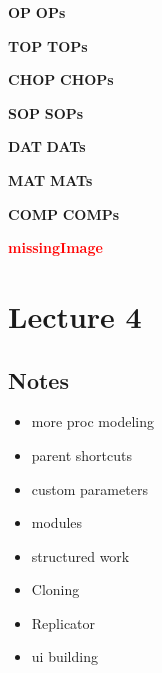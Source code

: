 \def\boldcommandlist{\@elt OP,\@elt OPs,}
\def\@elt#1,{%
 \expandafter\def\csname#1\endcsname{\textbf{#1}\xspace}
}
\boldcommandlist

\def\topColorList{\@elt TOP,\@elt TOPs,}
\def\@elt#1,{%
 \expandafter\def\csname#1\endcsname{\textcolor{TOP}{\textbf{#1}}\xspace}
}
\topColorList

\def\chopColorList{\@elt CHOP,\@elt CHOPs,}
\def\@elt#1,{%
 \expandafter\def\csname#1\endcsname{\textcolor{CHOP}{\textbf{#1}}\xspace}
}
\chopColorList

\def\sopColorList{\@elt SOP,\@elt SOPs,}
\def\@elt#1,{%
 \expandafter\def\csname#1\endcsname{\textcolor{SOP}{\textbf{#1}}\xspace}
}
\sopColorList

\def\datColorList{\@elt DAT,\@elt DATs,}
\def\@elt#1,{%
 \expandafter\def\csname#1\endcsname{\textcolor{DAT}{\textbf{#1}}\xspace}
}
\datColorList

\def\matColorList{\@elt MAT,\@elt MATs,}
\def\@elt#1,{%
 \expandafter\def\csname#1\endcsname{\textcolor{MAT}{\textbf{#1}}\xspace}
}
\matColorList


\def\compColorList{\@elt COMP,\@elt COMPs,}
\def\@elt#1,{%
 \expandafter\def\csname#1\endcsname{\textcolor{COMP}{\textbf{#1}}\xspace}
}
\compColorList

\def\redcommandlist{\@elt missingImage,}
\def\@elt#1,{%
 \expandafter\def\csname#1\endcsname{\textcolor{red}{\textbf{#1}}\xspace}
}
\redcommandlist


\chapter{Lecture 4}

\section{Notes}

\begin{itemize}
	\item more proc modeling
	\item parent shortcuts
	\item custom parameters
	\item modules
	\item structured work
	\item Cloning
	\item Replicator
	\item ui building
\end{itemize}

